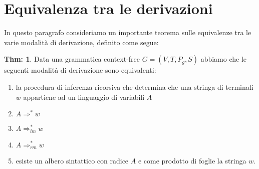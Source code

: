 \documentclass[a4paper]{book}
\theoremstyle{definition}%
\newtheorem{thm}{Thm:}[chapter]
\begin{document}
  \section{Equivalenza tra le derivazioni}
  In questo paragrafo consideriamo un importante teorema sulle equivalenze tra le varie modalità di derivazione, definito come segue:
  \begin{thm}
    Data una grammatica context-free $G = (V, T,P_g,S)$ abbiamo che le seguenti modalità di derivazione sono equivalenti:
    \begin{enumerate}
    \item la procedura di inferenza ricorsiva che determina che una stringa di terminali $w$ appartiene ad un linguaggio di variabili $A$
    \item $A \Rightarrow ^ * w$
    \item $A \Rightarrow _{lm} ^ * w$
    \item $A \Rightarrow _{rm} ^ * w$
    \item esiste un albero sintattico con radice $A$ e come prodotto di foglie la stringa $w$.
    \end{enumerate}
  \end{thm}
\end{document}

